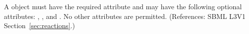 A \ModifierSpeciesReference object must have the required attribute 
 and may have the following optional attributes:
, ,  and .  
No other attributes are permitted.  
(References: SBML L3V1 Section~\ref{sec:reactions}.)
